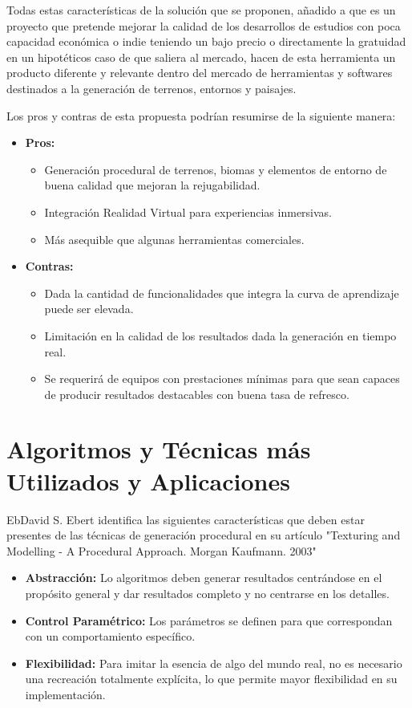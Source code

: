     Todas estas características de la solución que se proponen, añadido a que es un proyecto que pretende mejorar la calidad de los desarrollos de estudios con poca capacidad económica o indie teniendo un bajo precio o directamente la gratuidad en un hipotéticos caso de que saliera al mercado, hacen de esta herramienta un producto diferente y relevante dentro del mercado de herramientas y softwares destinados a la generación de terrenos, entornos y paisajes. 

    Los pros y contras de esta propuesta podrían resumirse de la siguiente manera:
    \begin{itemize}[label=--]
        \item \textbf{Pros:}
        \begin{itemize}[label=$\bullet$]
            \item Generación procedural de terrenos, biomas y elementos de entorno de buena calidad que mejoran la rejugabilidad.
            \item Integración Realidad Virtual para experiencias inmersivas.
            \item Más asequible que algunas herramientas comerciales.
        \end{itemize}
        \item \textbf{Contras:}
        \begin{itemize}[label=$\bullet$]
            \item Dada la cantidad de funcionalidades que integra la curva de aprendizaje puede ser elevada.
            \item Limitación en la calidad de los resultados dada la generación en tiempo real.
            \item Se requerirá de equipos con prestaciones mínimas para que sean capaces de producir resultados destacables con buena tasa de refresco.
        \end{itemize}
    \end{itemize}


    \section{Algoritmos y Técnicas más Utilizados y Aplicaciones}
    EbDavid S. Ebert identifica las siguientes características que deben estar presentes de las técnicas de generación procedural en su artículo "Texturing and Modelling - A Procedural Approach. Morgan Kaufmann. 2003" \cite{Ebert2003}
    \begin{itemize}
        \item \textbf{Abstracción:} Lo algoritmos deben generar resultados centrándose en el propósito general y dar resultados completo y no centrarse en los detalles.
        \item \textbf{Control Paramétrico:} Los parámetros se definen para que correspondan con un comportamiento específico.
        \item \textbf{Flexibilidad:} Para imitar la esencia de algo del mundo real, no es necesario una recreación totalmente explícita, lo que permite mayor flexibilidad en su implementación.
    \end{itemize}

